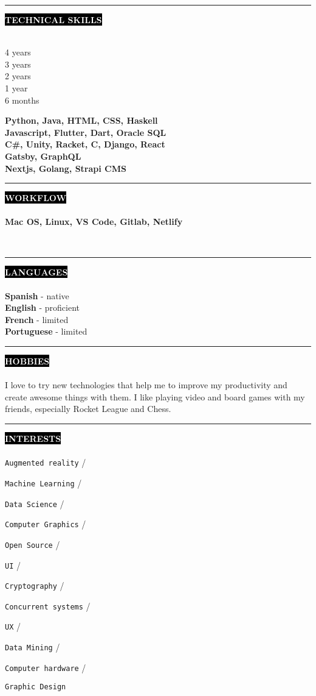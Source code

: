 \documentclass[10pt,A4]{article}
\newcounter{a}
\newcounter{b}
\newcounter{c}
\newcommand{\cvsection}[1] {
	\textcolor{white}{\MakeUppercase{\textbf{#1}}}
}
\newcommand{\cvsect}[1]{
	\colorbox{black}{{\cvsection{#1}}}\\\\%
}
\newcommand{\slashsep}{
	\hspace{2mm}/\hspace{2mm}
}
\begin{document}
	

	\begin{minipage}[t]{0.5\textwidth}\hrule height 0pt width 0pt%
	\cvsect{Technical Skills}
	\begin{minipage}[t]{0.3\textwidth}%
		4 years\\ 3 years \\ 2 years \\ 1 year \\ 6 months 
	\end{minipage}%
	\begin{minipage}[t]{0.7\textwidth}%
		\textbf{Python, Java, HTML, CSS, Haskell} \\ \textbf{Javascript, Flutter, Dart, Oracle SQL} \\ \textbf{C\#, Unity, Racket, C, Django, React} \\ \textbf{Gatsby, GraphQL} \\ \textbf{Nextjs, Golang, Strapi CMS}
	\end{minipage}%
	\end{minipage}%
	\hspace{1cm}
	\begin{minipage}[t]{0.45\textwidth}\hrule height 0pt width 0pt%
		\cvsect{Workflow}
		\textbf{Mac OS, Linux, VS Code, Gitlab, Netlify}
	\end{minipage}%
	\hspace{2cm}
	\\
	



	
	\begin{minipage}[t]{0.3\textwidth}\hrule height 0pt width 0pt%
		\cvsect{Languages}
		\textbf{Spanish} - native\\
		\textbf{English} - proficient\\
		\textbf{French} - limited\\
		\textbf{Portuguese} - limited\\
	\end{minipage}%
	\hspace{0cm}
	\begin{minipage}[t]{0.3\textwidth}\hrule height 0pt width 0pt%
		\cvsect{Hobbies}
		I love to try new technologies that help me to improve my productivity and create awesome things with them. 
		I like playing video and board games with my friends, especially Rocket League and Chess.
	\end{minipage}%
	\hspace{2cm}
	\begin{minipage}[t]{0.3\textwidth}\hrule height 0pt width 0pt%
		\cvsect{Interests}
		\texttt{Augmented reality}\slashsep
		\texttt{Machine Learning}\slashsep
		\texttt{Data Science}\slashsep
		\texttt{Computer Graphics}\slashsep
		\texttt{Open Source}\slashsep
		\texttt{UI}\slashsep
		\texttt{Cryptography}\slashsep
		\texttt{Concurrent systems}\slashsep
		\texttt{UX}\slashsep
		\texttt{Data Mining} \slashsep
		\texttt{Computer hardware} \slashsep
		\texttt{Graphic Design}

		
	\end{minipage}%
	
\end{document}

